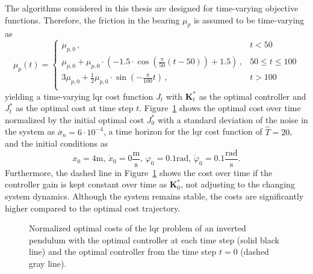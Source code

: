 The algorithms considered in this thesis are designed for time-varying objective functions. Therefore, the friction in the bearing $\mu_p$ is assumed to be time-varying as
\begin{equation}
    \mu_p(t) = \begin{cases}
        \mu_{p,0} \, ,& t < 50 \\
        \mu_{p,0}+\mu_{p,0} \cdot \left(-1.5 \cdot\cos\left(\frac{\pi}{50}(t-50)\right) + 1.5 \right)  \, ,& 50 \leq t \leq 100 \\
        3 \mu_{p,0} + \frac{1}{2}\mu_{p,0} \cdot \sin\left(-\frac{\pi}{100}t\right) \, ,& t > 100 \\
        \end{cases}
\end{equation}
yielding a time-varying \gls{lqr} cost function $J_t$ with $\mathbf{K}_t^*$ as the optimal controller and $J_t^*$ as the optimal cost at time step $t$. Figure~\ref{fig:LQR_cost} shows the optimal cost over time normalized by the initial optimal cost $J_0^*$ with a standard deviation of the noise in the system as $\bar{\sigma}_n = 6\cdot10^{-4}$, a time horizon for the \gls{lqr} cost function of $\hat{T} = 20$, and the initial conditions as
\begin{equation}
    x_0 = 4\si{\meter},\, \dot{x}_0= 0\frac{\si{\meter}}{\si{\second}} ,\, \varphi_0 = 0.1 \si{\radian},\, \dot{\varphi}_0 = 0.1\frac{\si{\radian}}{\si{\second}}.
    \label{eq:inital_conditions}
\end{equation}
Furthermore, the dashed line in Figure~\ref{fig:LQR_cost} shows the cost over time if the controller gain is kept constant over time as $\mathbf{K}_0^*$, not adjusting to the changing system dynamics. Although the system remains stable, the costs are significantly higher compared to the optimal cost trajectory.
\begin{figure}[h]
    \centering
    
    \caption[Increase in \gls{lqr} cost due to time-varying friction.]{Normalized optimal costs of the \gls{lqr} problem of an inverted pendulum with the optimal controller at each time step (solid black line) and the optimal controller from the time step $t=0$ (dashed gray line).}
    \label{fig:LQR_cost}
\end{figure}

